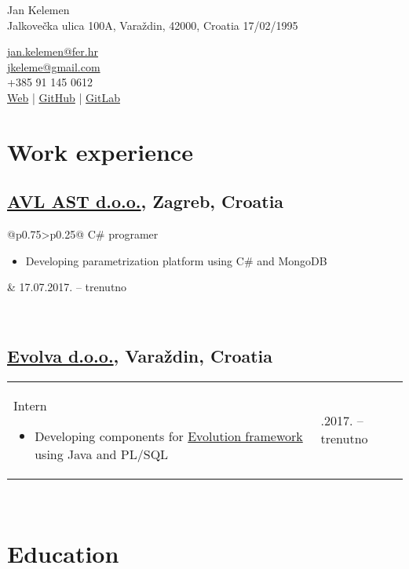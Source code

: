\documentclass[a4paper]{article}
\makeatletter
\newlength{\tablewidth}
\newenvironment{period}[2]{%
\newcommand{\sarma}{#2}%
\setlength{\tablewidth}{\linewidth}
\addtolength{\tablewidth}{-2\tabcolsep}
\begin{tabular}{@{}p{0.75\tablewidth}>{\raggedleft\arraybackslash}p{0.25\tablewidth}@{}}%
#1 \newline
\begin{itemize}
}{%
\end{itemize} & \sarma \\%
\end{tabular}\\
}
\makeatother
\begin{document}
\fontfamily{\sfdefault}
\selectfont

\begin{minipage}{.5\textwidth}
\LARGE{Jan Kelemen}\\
\normalsize{Jalkove\v{c}ka ulica 100A, Vara\v{z}din, 42000, Croatia}
\normalsize{17/02/1995}
\end{minipage}%
\begin{minipage}{.5\textwidth}
\raggedleft
\href{mailto:jan.kelemen@fer.hr}{jan.kelemen@fer.hr} \\
\href{mailto:jkeleme@gmail.com}{jkeleme@gmail.com} \\
+385 91 145 0612 \\
\href{http://jan-kelemen.github.io/}{Web} | \href{https://github.com/jan-kelemen}{GitHub} | \href{https://gitlab.com/jan-kelemen}{GitLab}
\end{minipage}

\vspace{1em}

\section{Work experience}
\subsection{\href{https://www.avl.com/}{AVL AST d.o.o.}, Zagreb, Croatia}
\begin{period}{C\# programer}{17.07.2017. -- trenutno}
	\item
		Developing parametrization platform using C\# and MongoDB
\end{period}
\subsection{\href{http://www.evolva.hr/hr/index.html}{Evolva d.o.o.}, Vara\v{z}din, Croatia}
\begin{period}{Intern}{22.08.2016. -- 23.09.2016.}
	\item
		Developing components for \href{http://www.evolution-framework.com/}{Evolution framework} using Java and PL/SQL
\end{period}

\section{Education}
\end{document}
